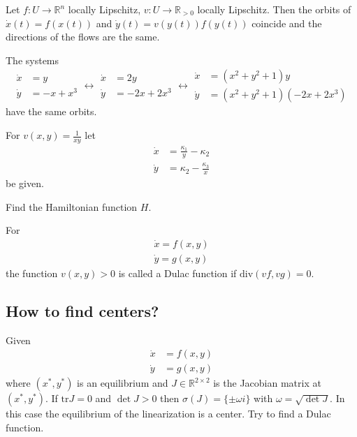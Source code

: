 \documentclass{article}
\newcommand*{\R}{\mathbb{R}}
\newcommand*{\Rn}{{\mathbb{R}^n}}
\newcommand*{\reci}[1]{{\frac{1}{#1}}}
\newcommand*{\tr}{\text{tr}}
\newcommand*{\divg}{\text{div}}
\begin{document}
\begin{lem}
    Let $f:U\to \Rn$ locally Lipschitz, $v:U\to \R_{>0}$ locally Lipschitz. Then the orbits of $\dot x(t)=f(x(t))$ and $\dot y(t)=v(y(t))f(y(t))$ coincide and the directions of the flows are the same.
\end{lem}

\begin{exam}
    The systems
    $$\begin{aligned}
        \dot x &= y\\
        \dot y &= -x+x^3
    \end{aligned}
    \leftrightarrow
    \begin{aligned}
        \dot x &= 2y\\
        \dot y &= -2x+2x^3
    \end{aligned}
    \leftrightarrow
    \begin{aligned}
        \dot x &= (x^2+y^2+1)y\\
        \dot y &= (x^2+y^2+1)(-2x+2x^3)
    \end{aligned}$$
    have the same orbits.
\end{exam}

\begin{exam}[Lotka ODE in $\R^2_+$]
    For $v(x,y)=\reci{xy}$ let
    $$\begin{aligned}
        \dot x &= \frac{\kappa_1}{y}-\kappa_2\\
        \dot y &= \kappa_2-\frac{\kappa_3}{x}
    \end{aligned}$$
    be given.
\end{exam}

\begin{hw}
    Find the Hamiltonian function $H$.
\end{hw}

\begin{defin}
    For
    $$\begin{aligned}
        \dot x=f(x,y)\\
        \dot y = g(x,y)
    \end{aligned}$$
    the function $v(x,y) > 0$ is called a Dulac function if $\divg(vf,vg) = 0$.
\end{defin}

\subsection{How to find centers?}

Given
$$\begin{aligned}
    \dot x &= f(x,y)\\
    \dot y &= g(x,y)
\end{aligned}$$
where $(x^*,y^*)$ is an equilibrium and $J \in \R^{2\times 2}$ is the Jacobian matrix at $(x^*,y^*)$. If $\tr J = 0$ and $\det J > 0$ then $\sigma(J) = \{\pm \omega i\}$ with $\omega = \sqrt{\det J}$. In this case the equilibrium of the linearization is a center. Try to find a Dulac function.
\end{document}
